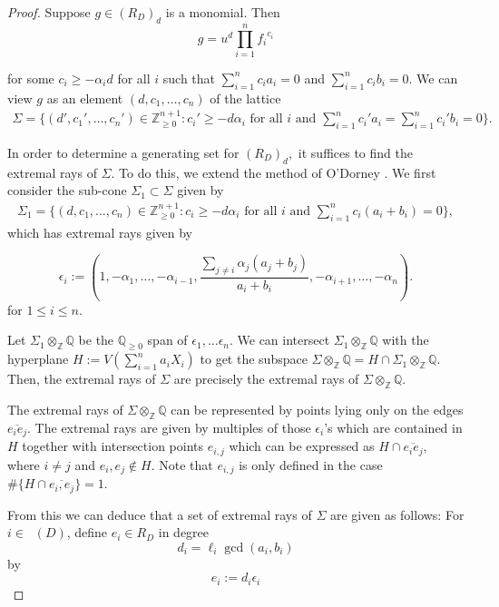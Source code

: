 \documentclass{amsart}
\theoremstyle{plain}
\theoremstyle{definition}
\theoremstyle{remark}
\numberwithin{equation}{section}
\newcommand\bq{{\mathbb Q}}
\newcommand\bz{{\mathbb Z}}
\newcommand\bida{a}
\newcommand\bidb{b}
\DeclareMathOperator{\Te}{T_=}
\begin{document}
\begin{proof}
Suppose $g
\in (R_D)_d$ is a monomial.
 Then 
\[
	g = u^d \prod_{i = 1}^n {f_i}^{c_i}
\]

\noindent
for some $c_i \ge - \alpha_i d$ for all $i$ such that $\sum_{i=1}^n c_i \bida_i = 0$
and $\sum_{i=1}^n c_i \bidb_i = 0$. We can view $g$ as an element $(d, c_1, \ldots, c_n)$ of the
lattice 
\begin{align*}
	\Sigma = \{ (d', c_1', \ldots, c_n') \in \bz_{\geq 0}^{n+1} : c_i' \ge - d
\alpha_i \text{ for all }i \text{ and }\sum_{i=1}^n c_i' \bida_i = \sum_{i =
1}^n c_i' \bidb_i = 0 \}.	
\end{align*}

In order to determine a generating
set for $(R_D)_d,$ it suffices to find the extremal rays of $\Sigma.$
To do this, we extend the method of O'Dorney \cite[Theorem 8]{dorney:canonical}. 
We first consider the sub-cone $\Sigma_1 \subset \Sigma$
given by
\begin{align*}
	\Sigma_1 = \{ (d, c_1, \ldots, c_n) \in \bz_{\geq 0}^{n+1} : c_i \ge -
d \alpha_i \text{ for all }i \text{ and }\sum_{i=1}^n c_i (\bida_i+\bidb_i) = 0
\},
\end{align*}
which
has extremal rays given by
 
\[
	\epsilon_i := (1, -\alpha_1, \ldots, -\alpha_{i-1}, \frac{\sum_{j \ne i}
	\alpha_j (\bida_j + \bidb_j)}{\bida_i + \bidb_i}, -\alpha_{i + 1},
	\ldots, -\alpha_n).
\]
for $1 \leq i \leq n$.

Let $\Sigma_1 \otimes_\bz \bq$ be the $\bq_{\ge 0}$ span of $\epsilon_1, \ldots \epsilon_n$.
We can intersect $\Sigma_1 \otimes_\bz \bq$ with the hyperplane $H :=
V(\sum_{i=1}^n \bida_i X_i)$  to get the subspace $\Sigma \otimes_\bz \bq = H \cap \Sigma_1
\otimes_\bz \bq$.  Then, the extremal rays of $\Sigma$ are precisely the extremal 
rays of $\Sigma \otimes_\bz \bq$.

The extremal rays of $\Sigma \otimes_\bz \bq$ can be represented by points
lying only on the edges 
$\overline{e_i e_j}$.
The extremal rays are given by multiples of those $\epsilon_i$'s
which are contained in $H$ together with intersection points $e_{i, j}$ which
can be expressed as $H \cap \overline{e_i e_j},$ where $i \neq j$ and $e_i,
e_j \notin H$. Note that $e_{i,j}$ is only defined in the case
$\# \{H \cap \overline{e_i, e_j}\} = 1$.


From this we can deduce that a set of extremal rays of $\Sigma$ are given as follows:
For $i \in \Te(D)$, define $e_i \in R_D$ in degree 
\[
	d_i = \ell_i \gcd(a_i, b_i)
\]
by 
\begin{equation}\label{eqn:epsilon_i}
	e_i := d_i \epsilon_i %
\end{equation}


\end{proof}
\end{document}
